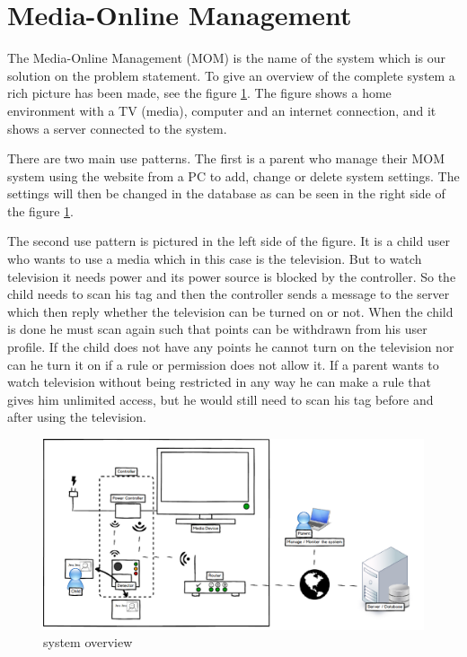 \section{Media-Online Management} %
The Media-Online Management (MOM) is the name of the system which is our solution on the problem statement. To give an overview of the complete system a rich picture\citep{OOAD} has been made, see the figure \ref{fig:systemoverview}. The figure shows a home environment with a TV (media), computer and an internet connection, and it shows a server connected to the system. 

There are two main use patterns. The first is a parent who manage their MOM system using the website from a PC to add, change or delete system settings. The settings will then be changed in the database as can be seen in the right side of the figure \ref{fig:systemoverview}. 

The second use pattern is pictured in the left side of the figure. It is a child user who wants to use a media which in this case is the television. But to watch television it needs power and its power source is blocked by the controller. So the child needs to scan his tag and then the controller sends a message to the server which then reply whether the television can be turned on or not. When the child is done he must scan again such that points can be withdrawn from his user profile. If the child does not have any points he cannot turn on the television nor can he turn it on if a rule or permission does not allow it. If a parent wants to watch television without being restricted in any way he can make a rule that gives him unlimited access, but he would still need to scan his tag before and after using the television. %

\begin{figure}
	\centering
		\includegraphics[width=1.50\textwidth, angle= 90]{images/systemoverview2.png}
	\caption{system overview}
	\label{fig:systemoverview}
\end{figure}

